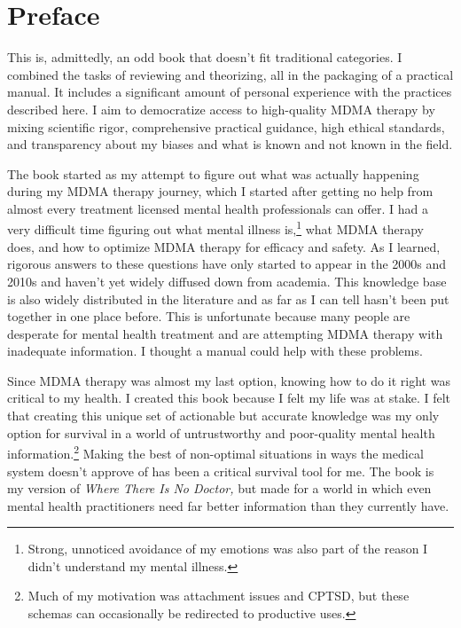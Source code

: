 \documentclass[11pt,oneside]{book}
\begin{document}

\chapter*{Preface}
\label{preface}
This is, admittedly, an odd book that doesn't fit traditional categories. I combined the tasks of reviewing and theorizing, all in the packaging of a practical manual. It includes a significant amount of personal experience with the practices described here. I aim to democratize access to high-quality MDMA therapy by mixing scientific rigor, comprehensive practical guidance, high ethical standards, and transparency about my biases and what is known and not known in the field.

The book started as my attempt to figure out what was actually happening during my MDMA therapy journey, which I started after getting no help from almost every treatment licensed mental health professionals can offer. I had a very difficult time figuring out what mental illness is,\footnote{Strong, unnoticed avoidance of my emotions was also part of the reason I didn't understand my mental illness.} what MDMA therapy does, and how to optimize MDMA therapy for efficacy and safety. As I learned, rigorous answers to these questions have only started to appear in the 2000s and 2010s and haven't yet widely diffused down from academia. This knowledge base is also widely distributed in the literature and as far as I can tell hasn't been put together in one place before. This is unfortunate because many people are desperate for mental health treatment and are attempting MDMA therapy with inadequate information. I thought a manual could help with these problems.

Since MDMA therapy was almost my last option, knowing how to do it right was critical to my health. I created this book because I felt my life was at stake. I felt that creating this unique set of actionable but accurate knowledge was my only option for survival in a world of untrustworthy and poor-quality mental health information.\footnote{Much of my motivation was attachment issues and CPTSD, but these schemas can occasionally be redirected to productive uses.} Making the best of non-optimal situations in ways the medical system doesn't approve of has been a critical survival tool for me. The book is my version of \textit{Where There Is No Doctor,} but made for a world in which even mental health practitioners need far better information than they currently have.
\end{document}
